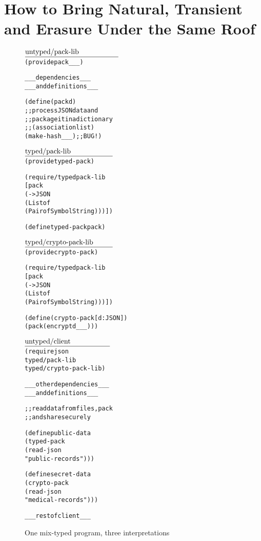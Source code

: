 \section{How to Bring Natural, Transient and Erasure Under the Same Roof} 


\def\fname#1#2{$\underline{\hbox to #2in{#1}}$\\[-2ex]}

\begin{figure*}[hbt]\footnotesize
  \vspace{-1mm}

\begin{minipage}[t]{2.2in}
\begin{alltt}\fname{untyped/pack-lib}{1.8}
(provide pack _ _ _)

_ _ _  dependencies     _ _ _
_ _ _  and definitions  _ _ _

(define (pack d)
  ;; process JSON data and 
  ;; package it in a dictionary
  ;; (association list)
  (make-hash _ _ _) ;; BUG!)


\end{alltt}
\end{minipage}\begin{minipage}[t]{2.2in}
\begin{alltt}\fname{typed/pack-lib}{1.7}
(provide typed-pack)

(require/typed pack-lib
  [pack 
  (-> JSON 
      (Listof 
       (Pairof Symbol String)))])

(define typed-pack pack) 
\end{alltt}
\smallskip
\begin{alltt}\fname{typed/crypto-pack-lib}{1.7}
(provide crypto-pack) 

(require/typed pack-lib
 [pack 
  (-> JSON 
      (Listof 
       (Pairof Symbol String)))])

(define (crypto-pack [d : JSON])
  (pack (encrypt d _ _ _)))

 \end{alltt}
\end{minipage}\begin{minipage}[t]{2.2in}
\begin{alltt}\fname{untyped/client}{1.65}
(require json 
         typed/pack-lib
           typed/crypto-pack-lib)

_ _ _  other dependencies  _ _ _
_ _ _  and definitions     _ _ _
          
;; read data from files, pack 
;; and share securely 

(define public-data 
  (typed-pack 
   (read-json 
    "public-records")))

(define secret-data 
  (crypto-pack 
   (read-json 
    "medical-records")))
 
 _ _ _ rest of client _ _ _
\end{alltt}\end{minipage}

   \caption{One mix-typed program, three interpretations} \label{fig:example}

  \vspace{-1mm}
\end{figure*}
